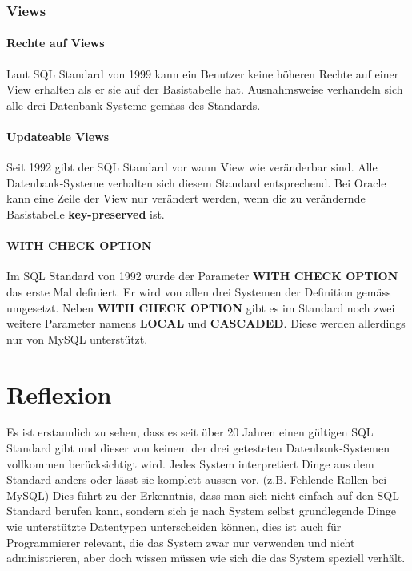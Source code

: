 \documentclass[10pt]{scrreprt}
\newcommand{\Bold}[1]{\textbf{#1}} %
\begin{document}
\subsection{Views}
\subsubsection{Rechte auf Views}
Laut SQL Standard von 1999 kann ein Benutzer keine höheren Rechte auf einer View erhalten als er sie auf der Basistabelle hat. Ausnahmsweise verhandeln sich alle drei Datenbank-Systeme gemäss des Standards.
\subsubsection{Updateable Views}
Seit 1992 gibt der SQL Standard vor wann View wie veränderbar sind. Alle Datenbank-Systeme verhalten sich diesem Standard entsprechend. Bei Oracle kann eine Zeile der View nur verändert werden, wenn die zu verändernde Basistabelle \Bold{key-preserved} ist.
\subsubsection{WITH CHECK OPTION}
Im SQL Standard von 1992 wurde der Parameter \Bold{WITH CHECK OPTION} das erste Mal definiert. Er wird von allen drei Systemen der Definition gemäss umgesetzt. Neben \Bold{WITH CHECK OPTION} gibt es im Standard noch zwei weitere Parameter namens \Bold{LOCAL} und \Bold{CASCADED}. Diese werden allerdings nur von MySQL unterstützt.

\chapter{Reflexion}
Es ist erstaunlich zu sehen, dass es seit über 20 Jahren einen gültigen SQL Standard gibt und dieser von keinem der drei getesteten Datenbank-Systemen vollkommen berücksichtigt wird. Jedes System interpretiert Dinge aus dem Standard anders oder lässt sie komplett aussen vor. (z.B. Fehlende Rollen bei MySQL)\newline
Dies führt zu der Erkenntnis, dass man sich nicht einfach auf den SQL Standard berufen kann, sondern sich je nach System selbst grundlegende Dinge wie unterstützte Datentypen unterscheiden können, dies ist auch für Programmierer relevant, die das System zwar nur verwenden und nicht administrieren, aber doch wissen müssen wie sich die das System speziell verhält.

\end{document}
